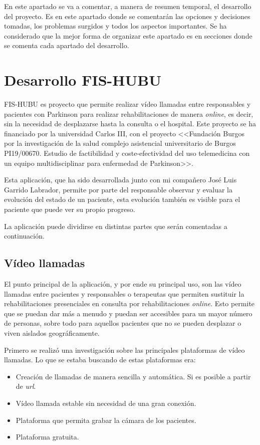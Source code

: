 
En este apartado se va a comentar, a manera de resumen temporal, el desarrollo del proyecto. Es en este apartado donde se comentarán las opciones y decisiones tomadas, los problemas surgidos y todos los aspectos importantes. Se ha considerado que la mejor forma de organizar este apartado es en secciones donde se comenta cada apartado del desarrollo.

\section{Desarrollo FIS-HUBU}\label{desarrolloFH}
FIS-HUBU es proyecto que permite realizar vídeo llamadas entre responsables y pacientes con Parkinson para realizar rehabilitaciones de manera \textit{online}, es decir, sin la necesidad de desplazarse hasta la consulta o el hospital. Este proyecto se ha financiado por la universidad Carlos III, con el proyecto  <<Fundación Burgos por la investigación de la salud complejo asistencial universitario de Burgos PI19/00670. Estudio de factibilidad y coste-efectividad del uso telemedicina con un equipo multidisciplinar para enfermedad de Parkinson>>.

Esta aplicación, que ha sido desarrollada junto con mi compañero José Luis Garrido Labrador, permite por parte del responsable observar y evaluar la evolución del estado de un paciente, esta evolución también es visible para el paciente que puede ver su propio progreso.

La aplicación puede dividirse en distintas partes que serán comentadas a continuación.
\subsection{Vídeo llamadas}
El punto principal de la aplicación, y por ende su principal uso, son las vídeo llamadas entre pacientes y responsables o terapeutas que permiten sustituir la rehabilitaciones presenciales en consulta por rehabilitaciones \textit{online}. Esto permite que se puedan dar más a menudo y puedan ser accesibles para un mayor número de personas, sobre todo para aquellos pacientes que no se pueden desplazar o viven aislados geográficamente.

Primero se realizó una investigación sobre las principales plataformas de vídeo llamadas. Lo que se estaba buscando de estas plataformas era:
\begin{itemize}
	\item Creación de llamadas de manera sencilla y automática. Si es posible a partir de \textit{url}.
	\item Vídeo llamada estable sin necesidad de una gran conexión.
	\item Plataforma que permita grabar la cámara de los pacientes.
	\item Plataforma gratuita.
\end{itemize}

